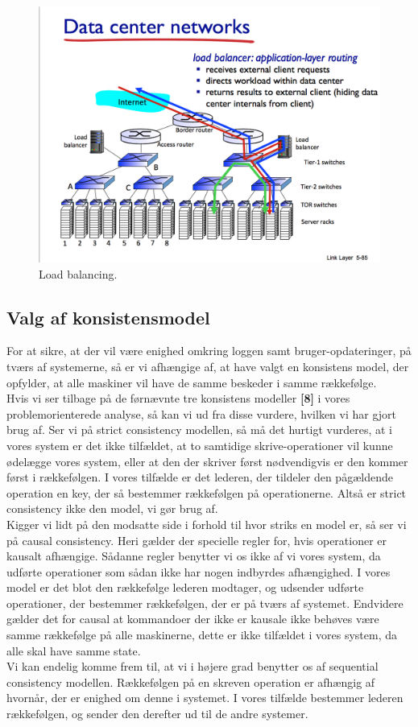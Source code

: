 \documentclass[a4paper,12pt]{article}
\begin{document}
\begin{figure}[H]
  \caption{Load balancing.}
  \centering
    \includegraphics[width=1\textwidth]{Loadbalancing}
\end{figure}

\subsection{Valg af konsistensmodel}
For at sikre, at der vil være enighed omkring loggen samt bruger-opdateringer, på tværs af systemerne, så er vi afhængige af, at have valgt en konsistens model, der opfylder, at alle maskiner vil have de samme beskeder i samme rækkefølge.
\\[5px]
Hvis vi ser tilbage på de førnævnte tre konsistens modeller \textbf{[8]} i vores problemorienterede analyse, så kan vi ud fra disse vurdere, hvilken vi har gjort brug af.
Ser vi på strict consistency modellen, så må det hurtigt vurderes, at i vores system er det ikke tilfældet, at to samtidige skrive-operationer vil kunne ødelægge vores system, eller at den der skriver først nødvendigvis er den kommer først i rækkefølgen. I vores tilfælde er det lederen, der tildeler den pågældende operation en key, der så bestemmer rækkefølgen på operationerne.
Altså er strict consistency ikke den model, vi gør brug af.
\\[5px]
Kigger vi lidt på den modsatte side i forhold til hvor striks en model er, så ser vi på causal consistency. Heri gælder der specielle regler for, hvis operationer er kausalt afhængige. Sådanne regler benytter vi os ikke af vi vores system, da udførte operationer som sådan ikke har nogen indbyrdes afhængighed. I vores model er det blot den rækkefølge lederen modtager, og udsender udførte operationer, der bestemmer rækkefølgen, der er på tværs af systemet.
Endvidere gælder det for causal at kommandoer der ikke er kausale ikke behøves være samme rækkefølge på alle maskinerne, dette er ikke tilfældet i vores system, da alle skal have samme state.
\\[5px]
Vi kan endelig komme frem til, at vi i højere grad benytter os af sequential consistency modellen. Rækkefølgen på en skreven operation er afhængig af hvornår, der er enighed om denne i systemet. I vores tilfælde bestemmer lederen rækkefølgen, og sender den derefter ud til de andre systemer.
\end{document}
